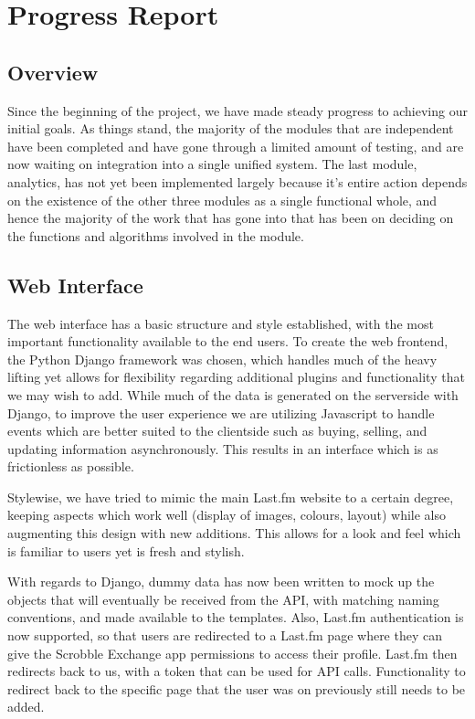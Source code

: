\documentclass[a4paper,10pt,twoside]{article}
\begin{document}
\section{Progress Report}
\subsection{Overview}

Since the beginning of the project, we have made steady progress to achieving our initial goals. As things stand, the majority of the modules that are independent have been completed and have gone through a limited amount of testing, and are now waiting on integration into a single unified system. The last module, analytics, has not yet been implemented largely because it's entire action depends on the existence of the other three modules as a single functional whole, and hence the majority of the work that has gone into that has been on deciding on the functions and algorithms involved in the module.

\subsection{Web Interface}

The web interface has a basic structure and style established, with the most important functionality available to the end users. To create the web frontend, the Python Django framework was chosen, which handles much of the heavy lifting yet allows for flexibility regarding additional plugins and functionality that we may wish to add. While much of the data is generated on the serverside with Django, to improve the user experience we are utilizing Javascript to handle events which are better suited to the clientside such as buying, selling, and updating information asynchronously. This results in an interface which is as frictionless as possible.

Stylewise, we have tried to mimic the main Last.fm website to a certain degree, keeping aspects which work well (display of images, colours, layout) while also augmenting this design with new additions. This allows for a look and feel which is familiar to users yet is fresh and stylish.

With regards to Django, dummy data has now been written to mock up the objects that will eventually be received from the API, with matching naming conventions, and made available to the templates. Also, Last.fm authentication is now supported, so that users are redirected to a Last.fm page where they can give the Scrobble Exchange app permissions to access their profile. Last.fm then redirects back to us, with a token that can be used for API calls. Functionality to redirect back to the specific page that the user was on previously still needs to be added.
 
\end{document}

